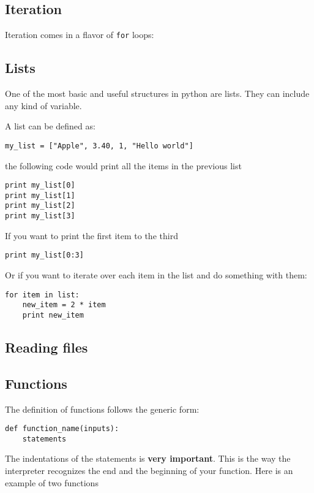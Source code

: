 \documentclass{article}
\begin{document}



\subsection{Iteration}
Iteration comes in a flavor of \verb"for" loops:



\subsection{Lists}
One of the most basic and useful structures in python are lists. They
can include any kind of variable.

A list can be defined as:
\begin{verbatim}
my_list = ["Apple", 3.40, 1, "Hello world"]
\end{verbatim}

the following code would print all the items in the previous list
\begin{verbatim}
print my_list[0]
print my_list[1]
print my_list[2]
print my_list[3]
\end{verbatim}

If you want to print the first item to the third

\begin{verbatim}
print my_list[0:3]
\end{verbatim}

Or if you want to iterate over each item in the list and do something
with them:

\begin{verbatim}
for item in list:
    new_item = 2 * item
    print new_item
\end{verbatim}

\subsection{Reading files}



\subsection{Functions}
The definition of functions follows the generic form:

\begin{verbatim}
def function_name(inputs):
    statements
\end{verbatim}

The indentations of the statements is {\bf very important}.  This is
the way the interpreter recognizes the end and the beginning of your
function. Here is an example of two functions   



\end{document}
